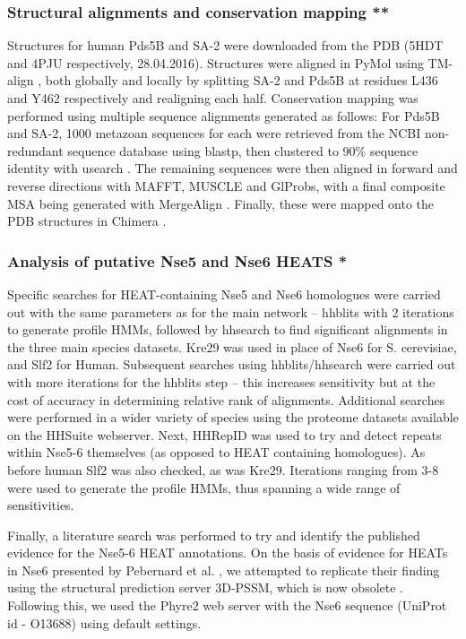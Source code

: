 \documentclass[a4paper,11pt,twoside,openright]{scrbook}
\begin{document}
\subsubsection{Structural alignments and conservation mapping **}
Structures for human Pds5B and SA-2 were downloaded from the PDB (5HDT \cite{Ouyang2016} and 4PJU \cite{Hara2014} respectively, 28.04.2016). Structures were aligned in PyMol using TM-align \cite{PyMol2016,Zhang2005}, both globally and locally by splitting SA-2 and Pds5B at residues L436 and Y462 respectively and realigning each half. Conservation mapping was performed using multiple sequence alignments generated as follows: For Pds5B and SA-2, 1000 metazoan sequences for each were retrieved from the NCBI non-redundant sequence database using blastp, then clustered to 90\% sequence identity with usearch \cite{Altschul1990,Edgar2010}. The remaining sequences were then aligned in forward and reverse directions with MAFFT, MUSCLE and GlProbs, with a final composite MSA being generated with MergeAlign \cite{Katoh2002,Edgar2004,Ye2015,Collingridge2012}. Finally, these were mapped onto the PDB structures in Chimera \cite{Pettersen2004}.

\subsubsection{Analysis of putative Nse5 and Nse6 HEATS *}
Specific searches for HEAT-containing Nse5 and Nse6 homologues were carried out with the same parameters as for the main network – hhblits with 2 iterations to generate profile HMMs, followed by hhsearch to find significant alignments in the three main species datasets. Kre29 was used in place of Nse6 for S. cerevisiae, and Slf2 for Human. Subsequent searches using hhblits/hhsearch were carried out with more iterations for the hhblits step – this increases sensitivity but at the cost of accuracy in determining relative rank of alignments. Additional searches were performed in a wider variety of species using the proteome datasets available on the HHSuite webserver. Next, HHRepID \cite{Biegert2008} was used to try and detect repeats within Nse5-6 themselves (as opposed to HEAT containing homologues). As before human Slf2 was also checked, as was Kre29. Iterations ranging from 3-8 were used to generate the profile HMMs, thus spanning a wide range of sensitivities.

Finally, a literature search was performed to try and identify the published evidence for the Nse5-6 HEAT annotations. On the basis of evidence for HEATs in Nse6 presented by Pebernard et al. \cite{Pebernard2006}, we attempted to replicate their finding using the structural prediction server 3D-PSSM, which is now obsolete \cite{Kelley2000}. Following this, we used the Phyre2 web server \cite{Kelley2015} with the Nse6 sequence (UniProt id - O13688) using default settings.
\end{document}
